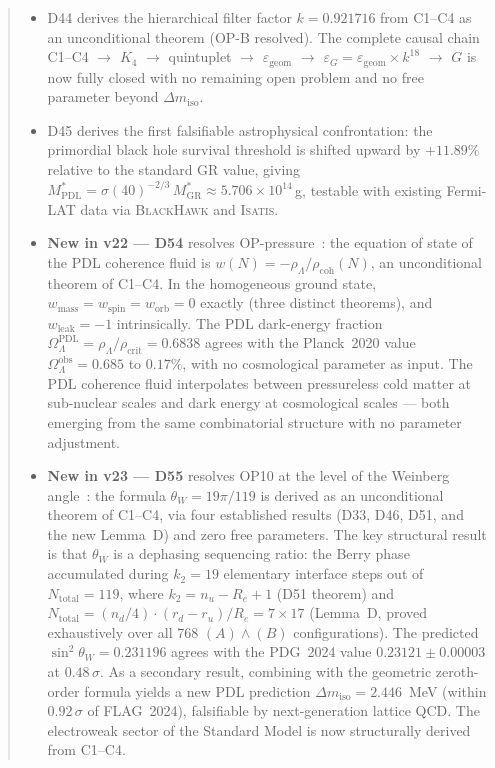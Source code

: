 \documentclass[11pt,a4paper]{article}
\theoremstyle{plain}
\theoremstyle{definition}
\theoremstyle{remark}
\newcommand{\rhocoh}{\rho_{\mathrm{coh}}}
\begin{document}
\begin{abstract}
\begin{itemize}
\item D44 derives the hierarchical filter factor $k = 0.921716$ from C1--C4 as an unconditional theorem (OP-B resolved). The complete causal chain C1--C4 $\to$ $K_4$ $\to$ quintuplet $\to$ $\varepsilon_{\mathrm{geom}}$ $\to$ $\varepsilon_G = \varepsilon_{\mathrm{geom}} \times k^{18}$ $\to$ $G$ is now fully closed with no remaining open problem and no free parameter beyond $\Delta m_{\mathrm{iso}}$.
\item D45 derives the first falsifiable astrophysical confrontation: the primordial black hole survival threshold is shifted upward by $+11.89\%$ relative to the standard GR value, giving $M^*_{\mathrm{PDL}} = \sigma(40)^{-2/3}\,M^*_{\mathrm{GR}} \approx 5.706 \times 10^{14}$\,g, testable with existing Fermi-LAT data via \textsc{BlackHawk} and \textsc{Isatis}.
\item \textbf{New in v22 --- D54} resolves OP-pressure~\cite{D54}: the equation of state of the PDL coherence fluid is $w(N) = -\rho_\Lambda/\rhocoh(N)$, an unconditional theorem of C1--C4. In the homogeneous ground state, $w_{\mathrm{mass}} = w_{\mathrm{spin}} = w_{\mathrm{orb}} = 0$ exactly (three distinct theorems), and $w_{\mathrm{leak}} = -1$ intrinsically. The PDL dark-energy fraction $\Omega_\Lambda^{\mathrm{PDL}} = \rho_\Lambda/\rho_{\mathrm{crit}} = 0.6838$ agrees with the Planck~2020 value $\Omega_\Lambda^{\mathrm{obs}} = 0.685$ to $0.17\%$, with no cosmological parameter as input. The PDL coherence fluid interpolates between pressureless cold matter at sub-nuclear scales and dark energy at cosmological scales --- both emerging from the same combinatorial structure with no parameter adjustment.
\item \textbf{New in v23 --- D55} resolves OP10 at the level of the Weinberg angle~\cite{D55}: the formula $\theta_W = 19\pi/119$ is derived as an unconditional theorem of C1--C4, via four established results (D33, D46, D51, and the new Lemma~D) and zero free parameters. The key structural result is that $\theta_W$ is a dephasing sequencing ratio: the Berry phase accumulated during $k_2 = 19$ elementary interface steps out of $N_{\mathrm{total}} = 119$, where $k_2 = n_u - R_e + 1$ (D51 theorem) and $N_{\mathrm{total}} = (n_d/4)\cdot(r_d-r_u)/R_e = 7\times 17$ (Lemma~D, proved exhaustively over all 768 $(A)\wedge(B)$ configurations). The predicted $\sin^2\theta_W = 0.231196$ agrees with the PDG~2024 value $0.23121\pm0.00003$ at $0.48\,\sigma$. As a secondary result, combining with the geometric zeroth-order formula yields a new PDL prediction $\Delta m_{\mathrm{iso}} = 2.446$~MeV (within $0.92\,\sigma$ of FLAG~2024), falsifiable by next-generation lattice QCD. The electroweak sector of the Standard Model is now structurally derived from C1--C4.

\end{itemize}
\end{abstract}
\end{document}
